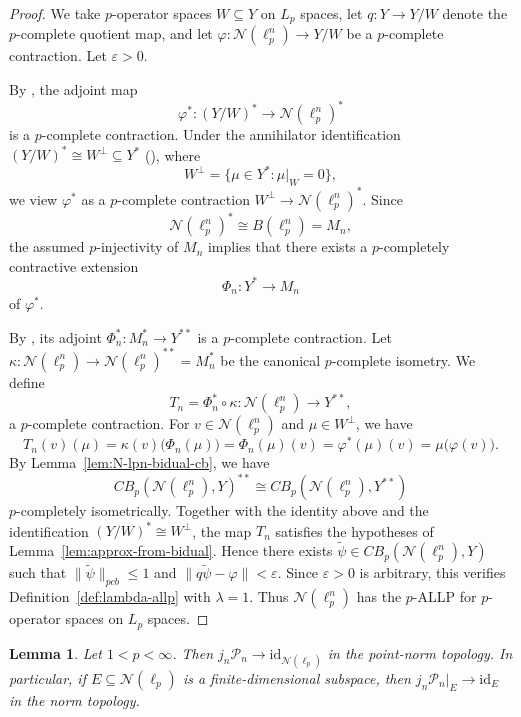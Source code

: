 \documentclass[12pt]{article}
\newtheorem{lemma}[theorem]{Lemma}
\newcommand{\pcb}{pcb}
\newcommand{\CBp}{CB_p}
\begin{document}
\begin{proof}
We take $p$-operator spaces $W\subseteq Y$ on $L_p$ spaces,
let $q:Y\to Y/W$ denote the $p$-complete quotient map, and let
$\varphi:\mathcal{N}(\ell_p^n)\to Y/W$ be a $p$-complete contraction.
Let $\varepsilon>0$.

By \cite[Lemma~4.5]{Daws2007}, the adjoint map
\[
        \varphi^*:(Y/W)^*\longrightarrow \mathcal{N}(\ell_p^n)^*
\]
is a $p$-complete contraction.
Under the annihilator identification $(Y/W)^*\cong W^\perp\subseteq Y^*$
(\cite[Lemma~4.6]{Daws2007}), where
\[
        W^\perp=\{\mu\in Y^*:\mu|_W=0\},
\]
we view $\varphi^*$ as a $p$-complete contraction $W^\perp\to \mathcal{N}(\ell_p^n)^*$.
Since
\[
        \mathcal{N}(\ell_p^n)^*\cong B(\ell_p^n)=M_n,
\]
the assumed $p$-injectivity of $M_n$ implies that there exists a $p$-completely
contractive extension
\[
        \Phi_n:Y^*\longrightarrow M_n
\]
of $\varphi^*$.

By \cite[Lemma~4.5]{Daws2007}, its adjoint $\Phi_n^*:M_n^*\to Y^{**}$ is a
$p$-complete contraction.
Let $\kappa:\mathcal{N}(\ell_p^n)\to \mathcal{N}(\ell_p^n)^{**}=M_n^*$ be the canonical $p$-complete isometry.
We define
\[
        T_n = \Phi_n^*\circ\kappa \colon \mathcal{N}(\ell_p^n) \longrightarrow Y^{**},
\]
a $p$-complete contraction.
For $v\in \mathcal{N}(\ell_p^n)$ and $\mu\in W^\perp$, we have
\begin{equation}\label{eq:T-matches-phi-lem}
        T_n(v)(\mu)
        =\kappa(v)\big(\Phi_n(\mu)\big)
        =\Phi_n(\mu)(v)
        =\varphi^*(\mu)(v)
        =\mu\big(\varphi(v)\big).
\end{equation}
By Lemma~\ref{lem:N-lpn-bidual-cb}, we have
\[
        \CBp(\mathcal{N}(\ell_p^n),Y)^{**} \cong \CBp(\mathcal{N}(\ell_p^n),Y^{**})
\]
$p$-completely isometrically.
Together with the identity above and the identification $(Y/W)^*\cong W^\perp$, the map $T_n$ satisfies the hypotheses of Lemma~\ref{lem:approx-from-bidual}.
Hence there exists $\widetilde\psi\in\CBp(\mathcal{N}(\ell_p^n),Y)$ such that $\|\widetilde\psi\|_{\pcb}\leq 1$ and $\|q\widetilde\psi-\varphi\|<\varepsilon$.
Since $\varepsilon>0$ is arbitrary, this verifies Definition~\ref{def:lambda-allp} with $\lambda=1$.
Thus $\mathcal{N}(\ell_p^n)$ has the $p$-ALLP for $p$-operator spaces on $L_p$ spaces.
\end{proof}

\begin{lemma}\label{lem:Pn-approx-identity}
Let $1<p<\infty$. Then $j_n\mathcal{P}_n\to \mathrm{id}_{\mathcal{N}(\ell_p)}$ in the point-norm topology.
In particular, if $E\subseteq \mathcal{N}(\ell_p)$ is a finite-dimensional subspace, then $j_n\mathcal{P}_n|_E\to\mathrm{id}_E$ in the norm topology.
\end{lemma}
\end{document}
